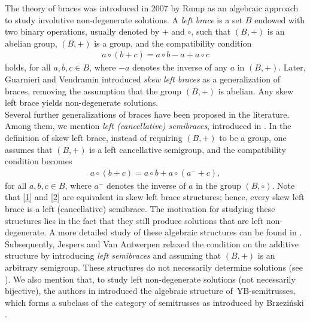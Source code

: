 \documentclass[11pt]{amsart}
\theoremstyle{definition}
\begin{document}
The theory of braces was introduced in 2007 by Rump \cite{Ru07} as an algebraic approach to study involutive non-degenerate solutions. A \emph{left brace} is a set $B$ endowed with two binary operations, usually denoted by $+$ and $\circ$, such that $(B, +)$ is an abelian group, $(B, +)$ is a group, and the compatibility condition
\begin{align}\label{1}
    a \circ (b+c)=a \circ b-a+a\circ c
\end{align}
holds, for all $a, b, c \in B$, where $-a$ denotes the inverse of any $a$ in $(B, +)$. Later, Guarnieri and Vendramin \cite{GuVe17} introduced \emph{skew left braces} as a generalization of braces, removing the assumption that the group $(B,+)$ is abelian. Any skew left brace yields non-degenerate solutions.\\
Several further generalizations of braces have been proposed in the literature. Among them, we mention \emph{left (cancellative) semibraces}, introduced in \cite{CaCoSt17}. In the definition of skew left brace, instead of requiring $(B,+)$ to be a group, one assumes that $(B,+)$ is a left cancellative semigroup, and the compatibility condition becomes
\begin{align}\label{2}
    a \circ (b+c)=a \circ b+a \circ \left(a^-+c\right),
\end{align}
for all $a, b, c \in B$, where $a^-$ denotes the inverse of $a$ in the group $(B, \circ)$. %
Note that \eqref{1} and \eqref{2} are equivalent in skew left brace structures; hence, every skew left brace is a left (cancellative) semibrace. The motivation for studying these structures lies in the fact that they still produce solutions that are left non-degenerate. A more detailed study of these algebraic structures can be found in \cite{CaCeSt22}.\\
Subsequently, Jespers and Van Antwerpen \cite{JeAr19} relaxed the condition on the additive structure by introducing \emph{left semibraces} and %
assuming that $(B, +)$ is an arbitrary semigroup. These structures do not necessarily determine solutions (see \cite[Theorem 3]{CCSt20-2}). We also mention that, to study left non-degenerate solutions (not necessarily bijective), the authors in \cite{COJeVaVe22} introduced the algebraic structure of~YB-se\-mi\-truss\-es, which forms a subclass of the category of semitrusses as introduced by Brzeziński \cite{Brz18}.

\smallskip
\end{document}
